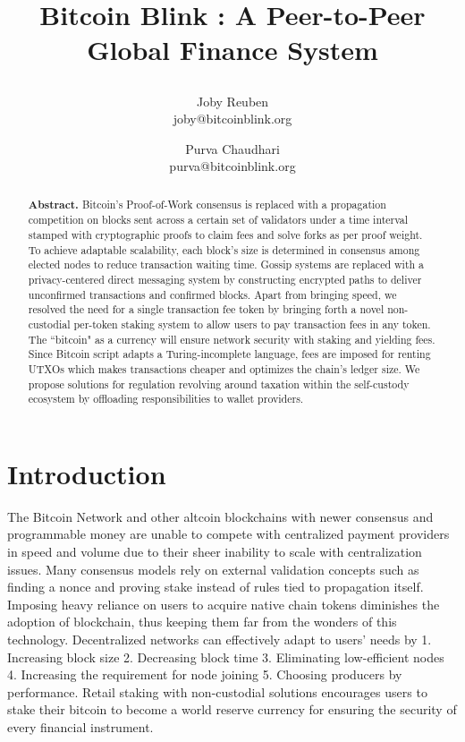 \documentclass[a4paper, 10pt]{extarticle}
\title{
 \large \textbf{Bitcoin Blink : A Peer-to-Peer Global Finance System}
\author{ \myfontt Joby Reuben \\ \myfontt joby@bitcoinblink.org \and  \myfontt Purva Chaudhari \\ \myfontt purva@bitcoinblink.org}}
\date{}
\begin{document}
\maketitle
\begin{abstract}
\noindent \textbf{Abstract.} Bitcoin's Proof-of-Work consensus is replaced with a propagation competition on blocks sent across a certain set of validators under a time interval stamped with cryptographic proofs to claim fees and solve forks as per proof weight. To achieve adaptable scalability, each block's size is determined in consensus among elected nodes to reduce transaction waiting time. Gossip systems are replaced with a privacy-centered direct messaging system by constructing encrypted paths to deliver unconfirmed transactions and confirmed blocks. Apart from bringing speed, we resolved the need for a single transaction fee token by bringing forth a novel non-custodial per-token staking system to allow users to pay transaction fees in any token. The ``bitcoin" as a currency will ensure network security with staking and yielding fees. Since Bitcoin script adapts a Turing-incomplete language, fees are imposed for renting UTXOs which makes transactions cheaper and optimizes the chain's ledger size. We propose solutions for regulation revolving around taxation within the self-custody ecosystem by offloading responsibilities to wallet providers. 
\end{abstract}
\section{Introduction}
The Bitcoin Network \cite{nakamoto2008bitcoin} and other altcoin blockchains with newer consensus and programmable money are unable to compete with centralized payment providers in speed and volume due to their sheer inability to scale with centralization issues. Many consensus models rely on external validation concepts such as finding a nonce and proving stake instead of rules tied to propagation itself. Imposing heavy reliance on users to acquire native chain tokens diminishes the adoption of blockchain, thus keeping them far from the wonders of this technology. Decentralized networks can effectively adapt to users’ needs by 1. Increasing block size 2. Decreasing block time 3. Eliminating low-efficient nodes 4. Increasing the requirement for node joining 5. Choosing producers by performance. Retail staking with non-custodial solutions encourages users to stake their bitcoin to become a world reserve currency for ensuring the security of every financial instrument.
\end{document}
